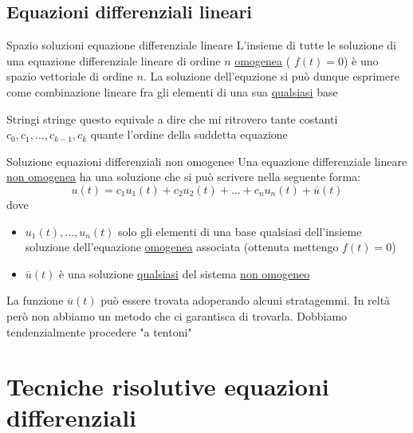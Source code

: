 \subsection{Equazioni differenziali lineari}

\begin{teorema}{Spazio soluzioni equazione differenziale lineare}
	L'insieme di tutte le soluzione di una equazione differenziale lineare di ordine $ n $ \underline{omogenea} ( $ f\left( t \right) =0 $) è uno spazio vettoriale di ordine $ n $. La soluzione dell'equzione si può dunque esprimere come combinazione lineare fra gli elementi di una sua \underline{qualsiasi} base
\end{teorema}

Stringi stringe questo equivale a dire che mi ritrovero tante costanti $ c_0,c_1,\ldots, c_{k-1}, c_{k} $ quante l'ordine della suddetta equazione
\begin{teorema}{Soluzione equazioni differenziali non omogenee}
	Una equazione differenziale lineare \underline{non omogenea} ha una soluzione che si può scrivere nella seguente forma:
	\[
		u\left( t \right) = c_1 u_1\left( t \right) + c_2u_2\left( t \right) + \ldots + c_nu_n\left( t \right) + \overline{u}\left( t \right)
	\]
	dove
	\begin{itemize}
		\item $ u_1\left( t \right) ,\ldots, u_n\left( t \right)  $ solo gli elementi di una base qualsiasi dell'insieme soluzione dell'equazione \underline{omogenea} associata (ottenuta mettengo $ f\left( t \right)=0  $)
		\item $ \overline{u}\left( t \right)  $ è una soluzione \underline{qualsiasi} del sistema \underline{non omogeneo}
	\end{itemize}

\end{teorema}

La funzione $ \overline{u}\left( t \right)  $ può essere trovata adoperando alcuni stratagemmi. In reltà però non abbiamo un metodo che ci garantisca di trovarla. Dobbiamo tendenzialmente procedere "a tentoni"

\section{Tecniche risolutive equazioni differenziali}
